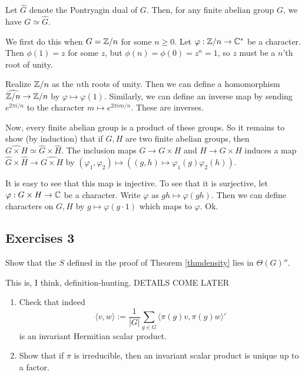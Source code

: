 \documentclass[11pt, english]{article}
\begin{document}
\begin{exc}
 Let $\hat G$ denote the Pontryagin dual of $G$. Then, for any finite abelian group $G$, we have $G \simeq \hat G$.
\end{exc}
\begin{sol}
We first do this when $G= \mathbb{Z}/n$ for some $n \geq 0$. Let $\varphi:\mathbb{Z}/n \to \mathbb{C}^\ast$ be a character. Then $\phi(1)=z$ for some $z$, but $\phi(n)=\phi(0)=z^n=1$, so $z$ must be a $n$'th root of unity.

Realize $\mathbb{Z}/n$ as the $n$th roots of unity. Then we can define a homomorphism $\widehat {\mathbb{Z}/n} \to \mathbb{Z}/n$ by $\varphi \mapsto \varphi(1)$. Similarly, we can define an inverse map by sending $e^{2\pi i/n}$  to the character $m \mapsto e^{2\pi i m /n}$. These are inverses.

Now, every finite abelian group is a product of these groups. So it remains to show (by induction) that if $G,H$ are two finite abelian groups, then $\widehat {G \times H} \simeq \widehat G \times \widehat H$. The inclusion maps $G \to G \times H$ and $H \to G \times H$ induces a map $\widehat G \times \widehat H \to \widehat{G \times H}$ by $(\varphi_1, \varphi_2) \mapsto ((g,h) \mapsto \varphi_1(g)\varphi_2(h))$.

It is easy to see that this map is injective. To see that it is surjective, let $\varphi:G \times H \to \mathbb{C}$ be a character. Write $\varphi$ as $gh \mapsto \varphi(gh)$. Then we can define characters on $G,H$ by $g \mapsto \varphi(g \cdot 1)$ which maps to $\varphi$. Ok.
\end{sol}

\subsection{Exercises 3}

\begin{exc}
Show that the $S$ defined in the proof of Theorem \eqref{thmdensity} lies in $\Theta(G)''$.
\end{exc}
\begin{sol}
 This is, I think, definition-hunting. DETAILS COME LATER
\end{sol}

\begin{exc}
  \begin{enumerate}
  \item Check that indeed 
$$
\langle v, w \rangle := \frac{1}{\lvert G \rvert} \sum_{g \in G} \langle \pi(g) v, \pi(g) w \rangle'
$$
is an invariant Hermitian scalar product.
\item Show that if $\pi$ is irreducible, then an invariant scalar product is unique up to a factor.
  \end{enumerate}
\end{exc}
\end{document}
